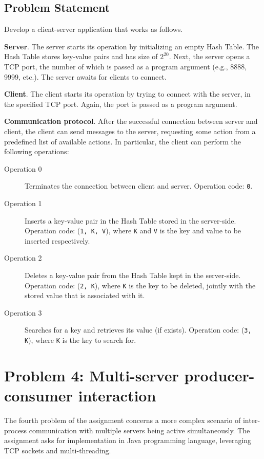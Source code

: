 \documentclass[acmlarge]{acmart}
\begin{document}
\subsection{Problem Statement}
Develop a client-server application that works as follows.

\textbf{Server}. The server starts its operation by initializing an empty Hash Table. The Hash Table stores key-value pairs and has size of $2^{20}$. Next, the server opens a TCP port, the number of which is passed as a program argument (e.g., 8888, 9999, etc.). The server awaits for clients to connect.

\textbf{Client}. The client starts its operation by trying to connect with the server, in the specified TCP port. Again, the port is passed as a program argument.

\textbf{Communication protocol}. After the successful connection between server and client, the client can send messages to the server, requesting some action from a predefined list of available actions. In particular, the client can perform the following operations:
\begin{description}
  \item[Operation 0] Terminates the connection between client and server. Operation code: \texttt{0}.
  \item[Operation 1] Inserts a key-value pair in the Hash Table stored in the server-side. Operation code: (\texttt{1, K, V}), where \texttt{K} and \texttt{V} is the key and value to be inserted respectively.
  \item[Operation 2] Deletes a key-value pair from the Hash Table kept in the server-side. Operation code: (\texttt{2, K}), where \texttt{K} is the key to be deleted, jointly with the stored value that is associated with it.
  \item[Operation 3] Searches for a key and retrieves its value (if exists). Operation code: (\texttt{3, K}), where \texttt{K} is the key to search for.
\end{description}


\section{Problem 4: Multi-server producer-consumer interaction}
\label{section:problem4}
The fourth problem of the assignment concerns a more complex scenario of inter-process communication with multiple servers being active simultaneously. The assignment asks for implementation in Java programming language, leveraging TCP sockets and multi-threading.
\end{document}
